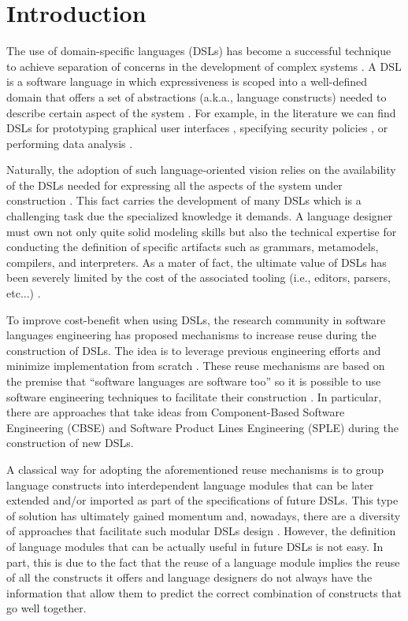 \section{Introduction}
\label{sec:introduction}

The use of domain-specific languages (DSLs) has become a successful technique to achieve separation of concerns in the development of complex systems \cite{Cook:2006}. A DSL is a software language in which expressiveness is scoped into a well-defined domain that offers a set of abstractions (a.k.a., language constructs) needed to describe certain aspect of the system \cite{Combemale:2014}. For example, in the literature we can find DSLs for prototyping graphical user interfaces \cite{Oney:2012}, specifying security policies \cite{Lodderstedt:2002}, or performing data analysis \cite{Eberius:2012}. 

Naturally, the adoption of such language-oriented vision relies on the availability of the DSLs needed for expressing all the aspects of the system under construction \cite{Clark:2013}. This fact carries the development of many DSLs which is a challenging task due the specialized knowledge it demands. A language designer must own not only quite solid modeling skills but also the technical expertise for conducting the definition of specific artifacts such as grammars, metamodels, compilers, and interpreters. As a mater of fact, the ultimate value of DSLs has been severely limited by the cost of the associated tooling (i.e., editors, parsers, etc...) \cite{jezequel:2014}.

To improve cost-benefit when using DSLs, the research community in software languages engineering has proposed mechanisms to increase reuse during the construction of DSLs. The idea is to leverage previous engineering efforts and minimize implementation from scratch \cite{Storm:2013}. These reuse mechanisms are based on the premise that ``software languages are software too'' \cite{Favre:2011} so it is possible to use software engineering techniques to facilitate their construction \cite{Kleppe:2009}. In particular, there are approaches that take ideas from Component-Based Software Engineering (CBSE) \cite{Cleenewerck:2003} and Software Product Lines Engineering (SPLE)  \cite{Zschaler:2010} during the construction of new DSLs.

A classical way for adopting the aforementioned reuse mechanisms is to group language constructs into interdependent language modules that can be later extended and/or imported as part of the specifications of future DSLs. This type of solution has ultimately gained momentum and, nowadays, there are a diversity of approaches that facilitate such modular DSLs design \cite{Vacchi:2015,Mernik:2013,Rumpe:2010}. However, the definition of language modules that can be actually useful in future DSLs is not easy. In part, this is due to the fact that the reuse of a language module implies the reuse of all the constructs it offers and language designers do not always have the information that allow them to predict the correct combination of constructs that go well together.

